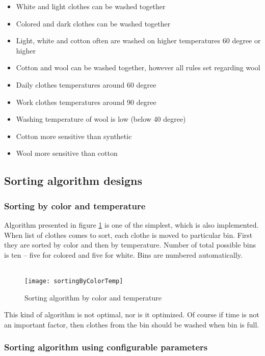 \begin{itemize}
	\item White and light clothes can be washed together
	\item Colored and dark clothes can be washed together
	\item Light, white and cotton often are washed on higher temperatures 60 degree or higher
	\item Cotton and wool can be washed together, however all rules set regarding wool
	\item Daily clothes temperatures around 60 degree
	\item Work clothes temperatures around 90 degree
	\item Washing temperature of wool is low (below 40 degree)
	\item Cotton more sensitive than synthetic
	\item Wool more sensitive than cotton
\end{itemize}

\subsection{Sorting algorithm designs}

\subsubsection{Sorting by color and temperature}

Algorithm presented in figure \ref{fig:sortingByColorTemp} is one of the simplest, which is also implemented. When list of clothes comes to sort, each clothe is moved to particular bin. First they are sorted by color and then by temperature. Number of total possible bins is ten – five for colored and five for white. Bins are numbered automatically. \\ \\

\begin{figure}[h]
	\centering
		\texttt{[image: sortingByColorTemp]}
	\caption{Sorting algorithm by color and temperature}
	\label{fig:sortingByColorTemp}
\end{figure}

This kind of algorithm is not optimal, nor is it optimized. Of course if time is not an important factor, then clothes from the bin should be washed when bin is full.

\subsubsection{Sorting algorithm using configurable parameters}

